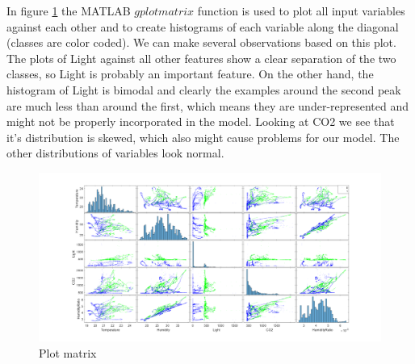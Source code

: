 \documentclass[a4paper, 11pt]{article}
\begin{document}
In figure \ref{fig:plotmatrix} the MATLAB $gplotmatrix$ function is used to plot all input variables against each other and to create histograms of each variable along the diagonal (classes are color coded). We can make several observations based on this plot. The plots of Light against all other features show a clear separation of the two classes, so Light is probably an important feature. On the other hand, the histogram of Light is bimodal and clearly the examples around the second peak are much less than around the first, which means they are under-represented and might not be properly incorporated in the model. Looking at CO2 we see that it's distribution is skewed, which also might cause problems for our model. The other distributions of variables look normal. 

\begin{figure}[h]
  \centering
    \includegraphics[width=1\textwidth]{../figures/plotmatrix.png}
	\caption{Plot matrix}    
    \label{fig:plotmatrix}
\end{figure}
\end{document}
